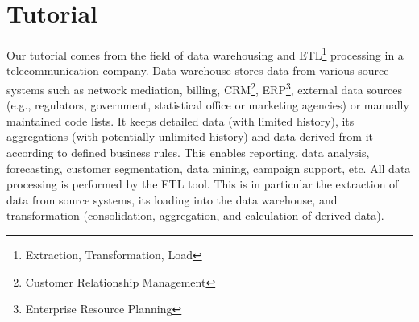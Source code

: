 \documentclass[a4paper,12pt,english,oneside]{book}
\newcommand{\exeta}{Exeta\xspace}
\begin{document}
%
%


\chapter{Tutorial}

Our tutorial comes from the field of data warehousing and ETL\footnote{Extraction, Transformation, Load} processing in a telecommunication company. Data warehouse stores data from various source systems such as network mediation, billing, CRM\footnote{Customer Relationship Management}, ERP\footnote{Enterprise Resource Planning}, external data sources (e.g., regulators, government, statistical office or marketing agencies) or manually maintained code lists. It keeps detailed data (with limited history), its aggregations (with potentially unlimited history) and data derived from it according to defined business rules. This enables reporting, data analysis, forecasting, customer segmentation, data mining, campaign support, etc. All data processing is performed by the ETL tool. This is in particular the extraction of data from source systems, its loading into the data warehouse, and transformation (consolidation, aggregation, and calculation of derived data).
\end{document}
